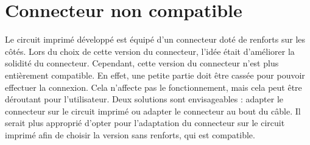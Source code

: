 \section{Connecteur non compatible}

Le circuit imprimé développé est équipé d'un connecteur doté de renforts sur les côtés.
Lors du choix de cette version du connecteur, l'idée était d'améliorer la solidité du connecteur.
Cependant, cette version du connecteur n'est plus entièrement compatible.
En effet, une petite partie doit être cassée pour pouvoir effectuer la connexion.
Cela n'affecte pas le fonctionnement, mais cela peut être déroutant pour l'utilisateur.
Deux solutions sont envisageables : adapter le connecteur sur le circuit imprimé ou adapter le connecteur au bout du câble.
Il serait plus approprié d'opter pour l'adaptation du connecteur sur le circuit imprimé afin de choisir la version sans renforts, qui est compatible.

